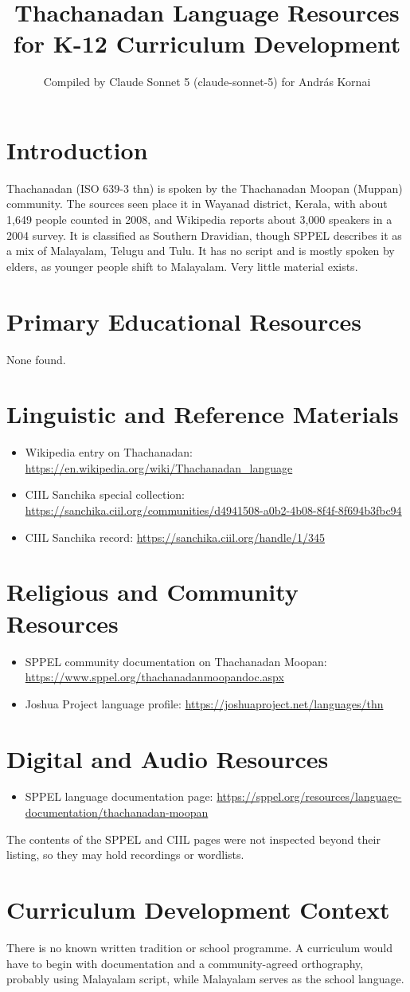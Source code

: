 \documentclass[12pt]{article}
\title{Thachanadan Language Resources for K-12 Curriculum Development}
\author{Compiled by Claude Sonnet 5 (claude-sonnet-5) for Andr\'as Kornai}
\date{}
\begin{document}
\maketitle

\section{Introduction}
Thachanadan (ISO 639-3 thn) is spoken by the Thachanadan Moopan (Muppan) community. The sources seen place it in Wayanad district, Kerala, with about 1,649 people counted in 2008, and Wikipedia reports about 3,000 speakers in a 2004 survey. It is classified as Southern Dravidian, though SPPEL describes it as a mix of Malayalam, Telugu and Tulu. It has no script and is mostly spoken by elders, as younger people shift to Malayalam. Very little material exists.

\section{Primary Educational Resources}
None found.

\section{Linguistic and Reference Materials}
\begin{itemize}
\item Wikipedia entry on Thachanadan: \url{https://en.wikipedia.org/wiki/Thachanadan_language}
\item CIIL Sanchika special collection: \url{https://sanchika.ciil.org/communities/d4941508-a0b2-4b08-8f4f-8f694b3fbc94}
\item CIIL Sanchika record: \url{https://sanchika.ciil.org/handle/1/345}
\end{itemize}

\section{Religious and Community Resources}
\begin{itemize}
\item SPPEL community documentation on Thachanadan Moopan: \url{https://www.sppel.org/thachanadanmoopandoc.aspx}
\item Joshua Project language profile: \url{https://joshuaproject.net/languages/thn}
\end{itemize}

\section{Digital and Audio Resources}
\begin{itemize}
\item SPPEL language documentation page: \url{https://sppel.org/resources/language-documentation/thachanadan-moopan}
\end{itemize}
The contents of the SPPEL and CIIL pages were not inspected beyond their listing, so they may hold recordings or wordlists.

\section{Curriculum Development Context}
There is no known written tradition or school programme. A curriculum would have to begin with documentation and a community-agreed orthography, probably using Malayalam script, while Malayalam serves as the school language.
\end{document}

